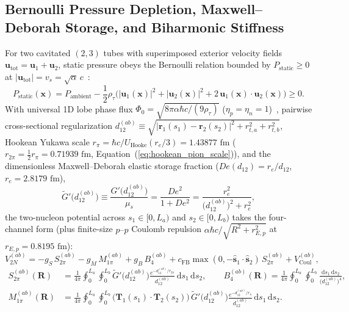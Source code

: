 \documentclass[11pt, a4paper]{article}
\DeclareRobustCommand{\dd}{\mathrm{d}}
\begin{document}
\subsection{Bernoulli Pressure Depletion, Maxwell--Deborah Storage, and Biharmonic Stiffness}
For two cavitated $(2,3)$ tubes with superimposed exterior velocity fields $\mathbf{u}_{\mathrm{tot}} = \mathbf{u}_1 + \mathbf{u}_2$, static pressure obeys the Bernoulli relation bounded by $P_{\mathrm{static}} \ge 0$ at $|\mathbf{u}_{\mathrm{tot}}| = v_s = \sqrt{\alpha}\,c$~\cite{bairmosheh2026,bairmosheh2026b}:
\begin{equation}
    P_{\mathrm{static}}(\mathbf{x}) = P_{\mathrm{ambient}} - \frac{1}{2}\rho_\tau\Big(|\mathbf{u}_1(\mathbf{x})|^2 + |\mathbf{u}_2(\mathbf{x})|^2 + 2\,\mathbf{u}_1(\mathbf{x})\cdot\mathbf{u}_2(\mathbf{x})\Big) \ge 0.
    \label{eq:bernoulli_master}
\end{equation}
With universal 1D lobe phase flux $\Phi_0 = \sqrt{8\pi\alpha\hbar c/(9\rho_\tau)}$ ($\eta_p = \eta_n = 1$)~\cite{bairmosheh2026}, pairwise cross-sectional regularization $d_{12}^{(ab)} \equiv \sqrt{|\mathbf{r}_1(s_1) - \mathbf{r}_2(s_2)|^2 + r_{t,a}^2 + r_{t,b}^2}$, Hookean Yukawa scale $r_\pi = \hbar c/U_{\mathrm{Hooke}}(r_e/3) = 1.43877\text{ fm}$ ($r_{2\pi} = \frac{1}{2}r_\pi = 0.71939\text{ fm}$, Equation~(\ref{eq:hookean_pion_scale})), and the dimensionless Maxwell--Deborah elastic storage fraction ($De(d_{12}) = r_e/d_{12}$, $r_e = 2.8179\text{ fm}$),
\begin{equation}
    \widetilde{G}'\!\big(d_{12}^{(ab)}\big) \equiv \frac{G'\big(d_{12}^{(ab)}\big)}{\mu_s} = \frac{De^2}{1 + De^2} = \frac{r_e^2}{\big(d_{12}^{(ab)}\big)^2 + r_e^2},
    \label{eq:maxwell_deborah_cutoff}
\end{equation}
the two-nucleon potential across $s_1 \in [0, L_a)$ and $s_2 \in [0, L_b)$ takes the four-channel form (plus finite-size $p\text{--}p$ Coulomb repulsion $\alpha\hbar c/\sqrt{R^2 + r_{E,p}^2}$ at $r_{E,p} = 0.8195\text{ fm}$):
\begin{equation}
    V_{2N}^{(ab)} = -g_S\,S_{2\pi}^{(ab)} - g_M\,M_{1\pi}^{(ab)} + g_B\,B_4^{(ab)} + c_{\mathrm{FB}}\max(0, -\hat{\mathbf{s}}_1\cdot\hat{\mathbf{s}}_2)\,S_{2\pi}^{(ab)} + V_{\mathrm{Coul}}^{(ab)},
    \label{eq:v2n_master}
\end{equation}
\begin{align}
    S_{2\pi}^{(ab)}(\mathbf{R}) &= \frac{1}{4\pi}\oint_0^{L_a}\!\!\oint_0^{L_b} \widetilde{G}'\!\big(d_{12}^{(ab)}\big)\frac{e^{-d_{12}^{(ab)}/r_{2\pi}}}{d_{12}^{(ab)}}\,\dd s_1\,\dd s_2, \qquad
    B_4^{(ab)}(\mathbf{R}) = \frac{1}{4\pi}\oint_0^{L_a}\!\!\oint_0^{L_b} \frac{\dd s_1\,\dd s_2}{\big(d_{12}^{(ab)}\big)^4}, \nonumber\\
    M_{1\pi}^{(ab)}(\mathbf{R}) &= \frac{1}{4\pi}\oint_0^{L_a}\!\!\oint_0^{L_b} \big(\mathbf{T}_1(s_1)\cdot\mathbf{T}_2(s_2)\big)\,\widetilde{G}'\!\big(d_{12}^{(ab)}\big)\frac{e^{-d_{12}^{(ab)}/r_\pi}}{d_{12}^{(ab)}}\,\dd s_1\,\dd s_2.
    \label{eq:M1pi_S2pi_B4}
\end{align}
\end{document}

